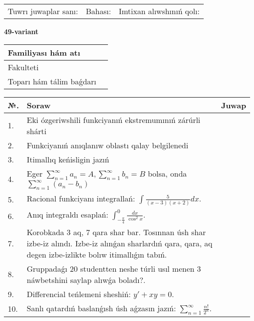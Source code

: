\documentclass{article}
\begin{document}
\vspace{1cm}

\begin{tabular}{ c c c }
Tuwrı juwaplar sanı: \underline{\hspace{2cm}} & Bahası: \underline{\hspace{2cm}} & Imtixan alıwshınıń qolı: \underline{\hspace{2cm}} \\
\end{tabular}

\newpage

\begin{center}\textbf{49-variant}\end{center}

\bgroup
\def\arraystretch{1.5}
\begin{tabular}{ |m{6cm}|m{10cm}| }
  \hline
  Familiyası hám atı & \\
  \hline
  Fakulteti &\\
  \hline
  Toparı hám tálim baǵdarı & \\
  \hline
\end{tabular}
\egroup

\vspace{0.5cm}

\bgroup
\def\arraystretch{2}
\begin{tabular}{ |l|m{8cm}|m{7cm}| }
  \hline
  №. & Soraw & Juwap \\
  \hline
  1. & Eki ózgeriwshili funkciyanıń ekstremumınıń zárúrli shárti &  \\
  \hline
  2. & Funkciyanıń anıqlanıw oblastı qalay belgilenedi &  \\
  \hline
  3. & Itimallıq keńisligin jazıń &  \\
  \hline
  4. & Eger $\displaystyle\sum_{n = 1}^{\infty}a_{n} = A, \sum_{n = 1}^{\infty}b_{n} = B$ bolsa, onda $\displaystyle\sum_{n = 1}^{\infty}\left( a_{n} - b_{n} \right)$ &  \\
  \hline
  5. & Racional funkciyanı integrallań: $\displaystyle\int {\frac{5}{(x - 3)(x + 2)}dx}$. &  \\
  \hline
  6. & Anıq integraldı esaplań: $\displaystyle\int_{-\frac{\pi}{4}}^{0}\frac{dx}{\cos^{2}x}$. &  \\
  \hline
  7. & Korobkada 3 aq, 7 qara shar bar. Tosınnan úsh shar izbe-iz alındı. Izbe-iz alınǵan sharlardıń qara, qara, aq degen izbe-izlikte bolıw itimallıǵın tabıń. &  \\
  \hline
  8. & Gruppadaǵı 20 studentten neshe túrli usıl menen 3 náwbetshini saylap alıwǵa boladı?. &  \\
  \hline
  9. & Differencial teńlemeni sheshiń: $y' + xy = 0$. &  \\
  \hline
  10. & Sanlı qatardıń baslanǵısh úsh aǵzasın jazıń: $\displaystyle\sum_{n = 1}^{\infty}\frac{n!}{2^{n}}$. &  \\
  \hline
\end{tabular}
\egroup
\end{document}
